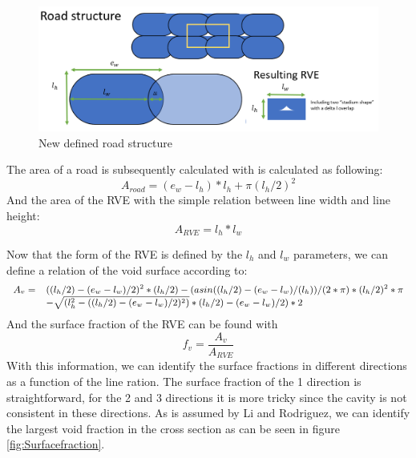 \begin{figure}[H]
    \centering
    \includegraphics[width=1\textwidth]{chapter_4_RVE_Definition/figures/Roadstructure2.PNG}
    \caption{New defined road structure}
    \label{fig:Roadstructure2}
\end{figure}

The area of a road is subsequently calculated with is calculated as following: 
\begin{equation} \label{eqn:crazecriterion}
A_{road}=(e_w-l_h)*l_h+\pi(l_h/2)^2
\end{equation}
And the area of the RVE with the simple relation between line width and line height:
\begin{equation} \label{eqn:crazecriterion}
A_{RVE}=l_h*l_w
\end{equation}

Now that the form of the RVE is defined by the $l_h$ and $l_w$ parameters, we can define a relation of the void surface according to: 
\begin{equation}
\small
\begin{array}{ll}
A_v = & ((l_h/2)-(e_w-l_w)/2)^2*(l_h/2)-(asin((l_h/2)-(e_w-l_w)/(l_h))/(2*\pi)*(l_h/2)^2*\pi 
\\
& -\sqrt{(l_h^2-((l_h/2)-(e_w-l_w)/2)^2 )}*(l_h/2)-(e_w-l_w)/2 )*2
\end{array}
\end{equation}
And the surface fraction of the RVE can be found with
\begin{equation}
f_v = \frac{A_v}{A_{RVE}}
\end{equation}
With this information, we can identify the surface fractions in different directions as a function of the line ration. The surface fraction of the 1 direction is straightforward, for the 2 and 3 directions it is more tricky since the cavity is not consistent in these directions. As is assumed by Li and Rodriguez, we can identify the largest void fraction in the cross section as can be seen in figure \ref{fig:Surfacefraction}.

